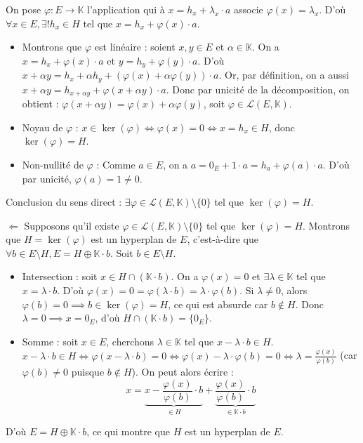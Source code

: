 \documentclass[11pt, a4paper]{article}
\theoremstyle{definition}
\begin{document}
On pose $\varphi : E \to \mathbb{K}$ l'application qui à $x = h_x + \lambda_x \cdot a$ associe $\varphi(x) = \lambda_x$.
D'où $\forall x \in E, \exists! h_x \in H$ tel que $x = h_x + \varphi(x) \cdot a$.

\begin{itemize}
    \item Montrons que $\varphi$ est linéaire : soient $x, y \in E$ et $\alpha \in \mathbb{K}$.
    On a $x = h_x + \varphi(x) \cdot a$ et $y = h_y + \varphi(y) \cdot a$.
    D'où $x + \alpha y = h_x + \alpha h_y + (\varphi(x) + \alpha \varphi(y)) \cdot a$.
    Or, par définition, on a aussi $x + \alpha y = h_{x+\alpha y} + \varphi(x + \alpha y) \cdot a$.
    Donc par unicité de la décomposition, on obtient :
    $\varphi(x + \alpha y) = \varphi(x) + \alpha \varphi(y)$, soit $\varphi \in \mathcal{L}(E, \mathbb{K})$.
    
    \item Noyau de $\varphi$ :
    $x \in \ker(\varphi) \iff \varphi(x) = 0 \iff x = h_x \in H$, donc $\ker(\varphi) = H$.
    
    \item Non-nullité de $\varphi$ :
    Comme $a \in E$, on a $a = 0_E + 1 \cdot a = h_a + \varphi(a) \cdot a$.
    D'où par unicité, $\varphi(a) = 1 \neq 0$.
\end{itemize}
Conclusion du sens direct : $\exists \varphi \in \mathcal{L}(E, \mathbb{K}) \setminus \{0\}$ tel que $\ker(\varphi) = H$.

$\Longleftarrow$ Supposons qu'il existe $\varphi \in \mathcal{L}(E, \mathbb{K}) \setminus \{0\}$ tel que $\ker(\varphi) = H$.
Montrons que $H = \ker(\varphi)$ est un hyperplan de $E$, c'est-à-dire que $\forall b \in E \setminus H, E = H \oplus \mathbb{K} \cdot b$.
Soit $b \in E \setminus H$.

\begin{itemize}
    \item Intersection : soit $x \in H \cap (\mathbb{K} \cdot b)$.
    On a $\varphi(x) = 0$ et $\exists \lambda \in \mathbb{K}$ tel que $x = \lambda \cdot b$.
    D'où $\varphi(x) = 0 = \varphi(\lambda \cdot b) = \lambda \cdot \varphi(b)$.
    Si $\lambda \neq 0$, alors $\varphi(b) = 0 \implies b \in \ker(\varphi) = H$, ce qui est absurde car $b \notin H$.
    Donc $\lambda = 0 \implies x = 0_E$, d'où $H \cap (\mathbb{K} \cdot b) = \{0_E\}$.
    
    \item Somme : soit $x \in E$, cherchons $\lambda \in \mathbb{K}$ tel que $x - \lambda \cdot b \in H$.
    $x - \lambda \cdot b \in H \iff \varphi(x - \lambda \cdot b) = 0 \iff \varphi(x) - \lambda \cdot \varphi(b) = 0 \iff \lambda = \frac{\varphi(x)}{\varphi(b)}$ (car $\varphi(b) \neq 0$ puisque $b \notin H$).
    On peut alors écrire :
    $$x = \underbrace{x - \frac{\varphi(x)}{\varphi(b)} \cdot b}_{\in H} + \underbrace{\frac{\varphi(x)}{\varphi(b)} \cdot b}_{\in \mathbb{K} \cdot b}$$
\end{itemize}
D'où $E = H \oplus \mathbb{K} \cdot b$, ce qui montre que $H$ est un hyperplan de $E$.
\end{document}
